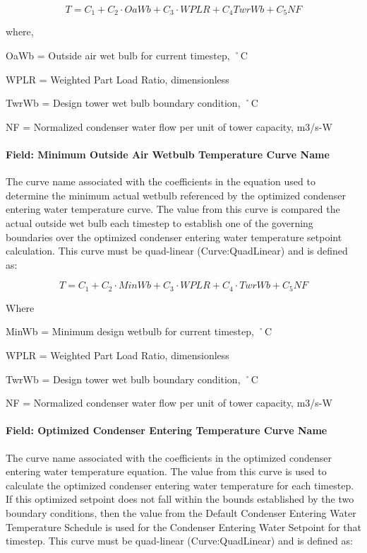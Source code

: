 \begin{equation}
T = {C_1} + {C_2}\cdot OaWb + {C_3}\cdot WPLR + {C_4}TwrWb + {C_5}NF
\end{equation}

where,

OaWb = Outside air wet bulb for current timestep, ˚C

WPLR = Weighted Part Load Ratio, dimensionless

TwrWb = Design tower wet bulb boundary condition, ˚C

NF = Normalized condenser water flow per unit of tower capacity, m3/s-W

\paragraph{Field: Minimum Outside Air Wetbulb Temperature Curve Name}\label{field-minimum-outside-air-wetbulb-temperature-curve-name}

The curve name associated with the coefficients in the equation used to determine the minimum actual wetbulb referenced by the optimized condenser entering water temperature curve. The value from this curve is compared the actual outside wet bulb each timestep to establish one of the governing boundaries over the optimized condenser entering water temperature setpoint calculation. This curve must be quad-linear (Curve:QuadLinear) and is defined as:

\begin{equation}
T = {C_1} + {C_2}\cdot MinWb + {C_3}\cdot WPLR + {C_4}\cdot TwrWb + {C_5}NF
\end{equation}

Where

MinWb = Minimum design wetbulb for current timestep, ˚C

WPLR = Weighted Part Load Ratio, dimensionless

TwrWb = Design tower wet bulb boundary condition, ˚C

NF = Normalized condenser water flow per unit of tower capacity, m3/s-W

\paragraph{Field: Optimized Condenser Entering Temperature Curve Name}\label{field-optimized-condenser-entering-temperature-curve-name}

The curve name associated with the coefficients in the optimized condenser entering water temperature equation. The value from this curve is used to calculate the optimized condenser entering water temperature for each timestep. If this optimized setpoint does not fall within the bounds established by the two boundary conditions, then the value from the Default Condenser Entering Water Temperature Schedule is used for the Condenser Entering Water Setpoint for that timestep. This curve must be quad-linear (Curve:QuadLinear) and is defined as:

